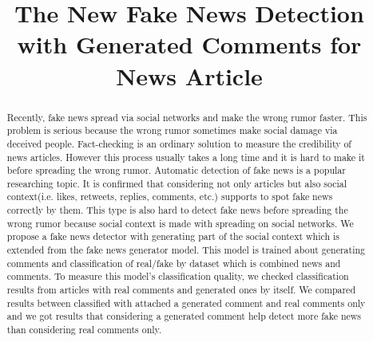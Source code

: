 \documentclass[conference]{IEEEtran}
\begin{document}
\title{The New Fake News Detection with Generated Comments for News Article%
}

\author{
\and
{}
\and
{}
\and
{}
}

\maketitle

\begin{abstract}
Recently, fake news spread via social networks and make the wrong rumor faster.
This problem is serious because the wrong rumor sometimes make social damage via deceived people.
Fact-checking is an ordinary solution to measure the credibility of news articles.
However this process usually takes a long time and it is hard to make it before spreading the wrong rumor.
Automatic detection of fake news is a popular researching topic.
It is confirmed that considering not only articles but also social context(i.e. likes, retweets, replies, comments, etc.) supports to spot fake news correctly by them.
This type is also hard to detect fake news before spreading the wrong rumor because social context is made with spreading on social networks.
We propose a fake news detector with generating part of the social context which is extended from the fake news generator model.
This model is trained about generating comments and classification of real/fake by dataset which is combined news and comments.
To measure this model's classification quality, we checked classification results from articles with real comments and generated ones by itself.
We compared results between classified with attached a generated comment and real comments only and we got results that considering a generated comment help detect more fake news than considering real comments only.
\end{abstract}
\end{document}
